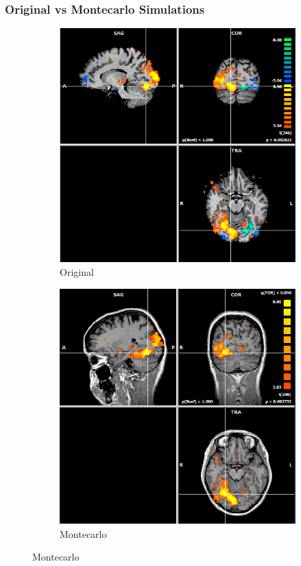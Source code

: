 \documentclass{beamer}
\begin{document}
\begin{frame}
\frametitle{Original vs Montecarlo Simulations}
\begin{figure}
    \centering
    \begin{subfigure}[b]{0.48\textwidth}
	    \includegraphics[width=\textwidth]{Images/Brainvoyager83187129.png}
	    \caption{Original}
    \end{subfigure}
    \begin{subfigure}[b]{0.48\textwidth}
	    \includegraphics[width=\textwidth]{Images/Brainvoyager83187129-PluginEsposito.png}
	    \caption{Montecarlo}
    \end{subfigure}
\end{figure}
\end{frame}
\end{document}
